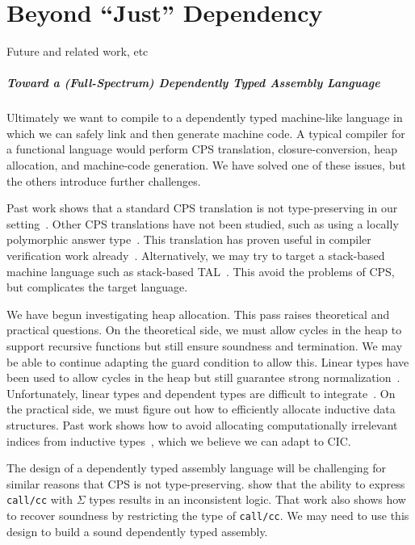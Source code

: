 \chapter{Beyond ``Just'' Dependency}
\label{chp:beyond}
Future and related work, etc

{
\paragraph{Toward a (Full-Spectrum) Dependently Typed Assembly Language}
\label{sec:future}
Ultimately we want to compile to a dependently typed machine-like language in which we can safely link
and then generate machine code.
A typical compiler for a functional language would perform CPS translation, closure-conversion, heap
allocation, and machine-code generation.
We have solved one of these issues, but the others introduce further challenges.

Past work shows that a standard CPS translation is not type-preserving in our
setting~\cite{barthe2002}.
Other CPS translations have not been studied, such as using a locally polymorphic answer type~\cite{thielecke04}.
This translation has proven useful in compiler verification work already~\cite{ahmed2011}.
Alternatively, we may try to target a stack-based machine language such as stack-based TAL~\cite{morrisett2002}.
This avoid the problems of CPS, but complicates the target language.

We have begun investigating heap allocation.
This pass raises theoretical and practical questions.
On the theoretical side, we must allow cycles in the heap to support recursive functions but still
ensure soundness and termination.
We may be able to continue adapting the guard condition to allow this.
Linear types have been used to allow cycles in the heap but still guarantee strong
normalization~\cite{morrisett2005}.
Unfortunately, linear types and dependent types are difficult to integrate~\cite{McBride2016}.
On the practical side, we must figure out how to efficiently allocate inductive data structures.
Past work shows how to avoid allocating computationally irrelevant indices from inductive
types~\cite{brady2003}, which we believe we can adapt to CIC.

The design of a dependently typed assembly language will be challenging for similar reasons that CPS
is not type-preserving.
\citet{herbelin2005} show that the ability to express \verb|call/cc| with $\Sigma$ types results in an
inconsistent logic.
That work also shows how to recover soundness by restricting the type of \verb|call/cc|.
We may need to use this design to build a sound dependently typed assembly.
}
